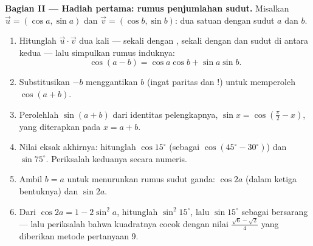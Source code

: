 \begin{problem}
\medskip
\noindent\textbf{Bagian II --- Hadiah pertama: rumus penjumlahan
sudut.}
Misalkan $\vec u = (\cos a, \sin a)$ dan $\vec v = (\cos b, \sin b)$:
dua  satuan dengan sudut $a$ dan $b$.
\begin{enumerate}[resume]
  \item Hitunglah $\vec u \cdot \vec v$ dua kali --- sekali dengan
        , sekali dengan  dan sudut di antara kedua
         --- lalu simpulkan rumus induknya:
        \[
        \cos(a - b) = \cos a \cos b + \sin a \sin b .
        \]
  \item Substitusikan $-b$ menggantikan $b$ (ingat paritas  dan !)
        untuk memperoleh $\cos(a + b)$.
  \item Perolehlah $\sin(a + b)$ dari identitas pelengkapnya,
        $\sin x = \cos\left(\frac\pi2 - x\right)$, yang diterapkan pada
        $x = a + b$.
  \item Nilai eksak akhirnya: hitunglah $\cos 15^\circ$ (sebagai
        $\cos(45^\circ - 30^\circ)$) dan $\sin 75^\circ$. Periksalah
        keduanya secara numeris.
  \item Ambil $b = a$ untuk menurunkan rumus sudut ganda:
        $\cos 2a$ (dalam ketiga bentuknya) dan $\sin 2a$.
  \item Dari $\cos 2a = 1 - 2\sin^2 a$, hitunglah
        $\sin^2 15^\circ$, lalu $\sin 15^\circ$ sebagai 
        bersarang --- lalu periksalah bahwa kuadratnya cocok dengan
        nilai $\frac{\sqrt6 - \sqrt2}{4}$ yang diberikan metode
        pertanyaan 9.
\end{enumerate}


\end{problem}
